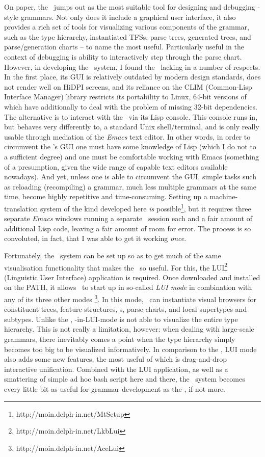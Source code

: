On paper, the \lkb\ jumps out as the most suitable tool for designing and
debugging \delphin-style grammars. Not only does it include a graphical user
interface, it also provides a rich set of tools for visualizing various
components of the grammar, such as the type hierarchy, instantiated TFSs, parse
trees, generated trees, and parse/generation charts -- to name the most useful.
Particularly useful in the context of debugging is  ability to interactively
step through the parse chart. However, in developing the \depicto\ system, I
found the \lkb\ lacking in a number of respects. In the first place, its GUI is
relatively outdated by modern design standards, does not render well on HiDPI
screens, and its reliance on the CLIM (Common-Lisp Interface Manager) library
restricts its portability to Linux, 64-bit versions of which have additionally
to deal with the problem of missing 32-bit dependencies. The alternative is to
interact with the \lkb\ via its Lisp console. This console runs in, but behaves
very differently to, a standard Unix shell/terminal, and is only really usable
through mediation of the \emph{Emacs} text editor. In other words, in order to
circumvent the \lkb's GUI one must have some knowledge of Lisp (which I do not
to a sufficient degree) and one must be comfortable working with Emacs
(something of a presumption, given the wide range of capable text editors
available nowadays). And yet, unless one is able to circumvent the GUI, simple
tasks such as reloading (recompiling) a grammar, much less multiple grammars at
the same time, become highly repetitive and time-consuming. Setting up a
machine-translation system of the kind developed here \emph{is}
possible\footnote{http://moin.delph-in.net/MtSetup}, but it requires three
separate \emph{Emacs} windows running a separate \lkb\ session each and a fair
amount of additional Lisp code, leaving a fair amount of room for error. The
process is so convoluted, in fact, that I was able to get it working
\emph{once}.

Fortunately, the \ace\ system can be set up so as to get much of the same
visualisation functionality that makes the \lkb\ so useful. For this, the
LUI\footnote{http://moin.delph-in.net/LkbLui} (Linguistic User Interface)
application is required. Once downloaded and installed on the PATH, it allows
\ace\ to start up in so-called \emph{LUI mode} in combination with any of its
three other modes \footnote{http://moin.delph-in.net/AceLui}. In this mode,
\ace\ can instantiate visual browsers for constituent trees, feature
structures, \mrs s, parse charts, and local supertypes and subtypes. Unlike the
\lkb, \ace-in-LUI-mode is not able to visualize the entire type hierarchy. This
is not really a limitation, however: when dealing with large-scale grammars,
there inevitably comes a point when the type hierarchy simply becomes too big
to be visualized informatively. In comparison to the \lkb, LUI mode also adds
some new features, the most useful of which is drag-and-drop interactive
unification. Combined with the LUI application, as well as a smattering of
simple ad hoc bash script here and there, the \ace\ system becomes every little
bit as useful for grammar development as the \lkb, if not more.

